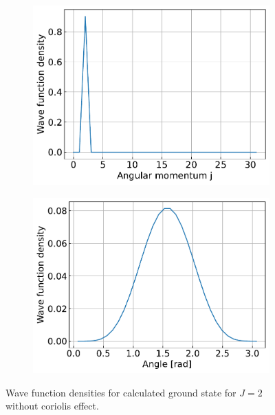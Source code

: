 \documentclass{article}
\begin{document}
\begin{figure}[H]
\begin{subfigure}{.4\linewidth}
        \end{subfigure}
        \begin{subfigure}{.4\linewidth}
            \centering
            \includegraphics[width=\linewidth]{harmonic_iso_angular.pdf}
        \end{subfigure}
        \begin{subfigure}{.4\linewidth}
            \centering
            \includegraphics[width=\linewidth]{harmonic_iso_polar.pdf}
        \end{subfigure}
        \caption{Wave function densities for calculated ground state for $J = 2$ without coriolis effect.}
    \end{figure}
\end{document}
